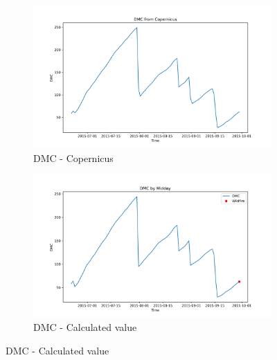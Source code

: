 \begin{figure}[h]
\caption{Comparison of DMC calculated values and Copernicus}
    \centering
    \begin{subfigure}{0.49\textwidth}
        \centering
        \includegraphics[width=\textwidth]{graphs/2015MesmoSitio/2015CopernicusDMC12.png}
        \caption{DMC - Copernicus}
        \label{fig:dmc_copernicus_2015_semfogo}
    \end{subfigure}
    \hfill
    \begin{subfigure}{0.49\textwidth}
        \centering
        \includegraphics[width=\textwidth]{graphs/2015MesmoSitio/2015CalcDMC12.png}
        \caption{DMC - Calculated value}
        \label{fig:dmc_calculated_2015_semfogo}
    \end{subfigure}
    \label{fig:comparison_dmc_semfogo_copernicus_calculated}
\end{figure}

